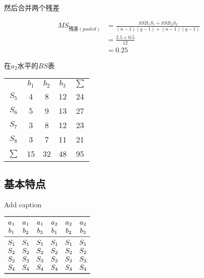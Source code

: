 然后合并两个残差

\begin{align*}
    MS_{\text{残差} \left( pooled\right) } &= \frac{SSB_1S_1+SSB_2S_2}{(n-1)(q-1)+(n-1)(q-1)}\\
                                           &= \frac{2.5+0.5}{12}\\
                                           &= 0.25
\end{align*}

\begin{margintable}
  \centering
  \caption{在$a_2$水平的$BS$表}
    \begin{tabular}{ccccc}
          & $b_1$ & $b_2$ & $b_3$ & $\sum$ \\
    $S_5$ & \cellcolor[rgb]{ .886,  .937,  .855}4 & \cellcolor[rgb]{ .886,  .937,  .855}8 & \cellcolor[rgb]{ .886,  .937,  .855}12 & \cellcolor[rgb]{ 1,  .949,  .8}24 \\
    $S_6$ & \cellcolor[rgb]{ .886,  .937,  .855}5 & \cellcolor[rgb]{ .886,  .937,  .855}9 & \cellcolor[rgb]{ .886,  .937,  .855}13 & \cellcolor[rgb]{ 1,  .949,  .8}27 \\
    $S_7$ & \cellcolor[rgb]{ .886,  .937,  .855}3 & \cellcolor[rgb]{ .886,  .937,  .855}8 & \cellcolor[rgb]{ .886,  .937,  .855}12 & \cellcolor[rgb]{ 1,  .949,  .8}23 \\
    $S_8$ & \cellcolor[rgb]{ .886,  .937,  .855}3 & \cellcolor[rgb]{ .886,  .937,  .855}7 & \cellcolor[rgb]{ .886,  .937,  .855}11 & \cellcolor[rgb]{ 1,  .949,  .8}21 \\
    $\sum$ & \cellcolor[rgb]{ .929,  .929,  .929}15 & \cellcolor[rgb]{ .929,  .929,  .929}32 & \cellcolor[rgb]{ .929,  .929,  .929}48 & \cellcolor[rgb]{ .867,  .922,  .969}95 \\
    \end{tabular}
\end{margintable}

\subsection{基本特点}

\begin{margintable}
  \centering
  \caption{Add caption}
    $\begin{array}{cccccc}
    \toprule
        a_1    & a_1    & a_1    & a_2    & a_2    & a_2 \\
        b_1    & b_2    & b_3    & b_1    & b_2    & b_3 \\
    \midrule
        S_1    & S_1    & S_1    & S_1    & S_1    & S_1 \\
        S_2    & S_2    & S_2    & S_2    & S_2    & S_2 \\
        S_3    & S_3    & S_3    & S_3    & S_3    & S_3 \\
        S_4    & S_4    & S_4    & S_4    & S_4    & S_4 \\
    \bottomrule
    \end{array}$
  \label{tab:addlabel}%
\end{margintable}%

